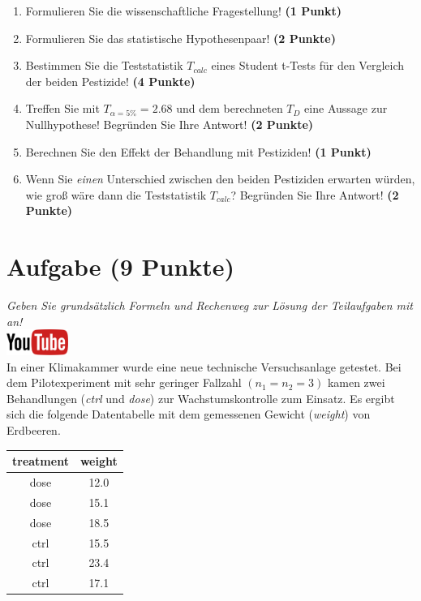 \documentclass[a4paper, 9pt]{scrartcl}\usepackage[]{graphicx}\usepackage[]{xcolor}
\begin{document}
\begin{enumerate}
  \item Formulieren Sie die wissenschaftliche Fragestellung! \textbf{(1 Punkt)}
  \item Formulieren Sie das statistische Hypothesenpaar! \textbf{(2
      Punkte)}
  \item Bestimmen Sie die Teststatistik $T_{calc}$ eines Student t-Tests f{\"u}r den
  Vergleich der beiden Pestizide! \textbf{(4 Punkte)}
\item Treffen Sie mit $T_{\alpha = 5\%} = 2.68$ und dem berechneten $T_{D}$ eine Aussage
  zur Nullhypothese! Begr{\"u}nden Sie Ihre Antwort! \textbf{(2 Punkte)}
\item Berechnen Sie den Effekt der Behandlung mit Pestiziden! \textbf{(1 Punkt)}
\item Wenn Sie \textit{einen} Unterschied zwischen den beiden
  Pestiziden erwarten w{\"u}rden, wie gro{\ss} w{\"a}re dann die Teststatistik
  $T_{calc}$? Begr{\"u}nden Sie Ihre Antwort! \textbf{(2 Punkte)}
\end{enumerate} 
\clearpage

\section{Aufgabe \hfill (9 Punkte)}

\textit{Geben Sie grunds{\"a}tzlich Formeln und Rechenweg zur L{\"o}sung der
  Teilaufgaben mit an!} \\[1Ex]

\hfill\href{https://youtu.be/eejS2uG4o-M}{\includegraphics[width =
  2cm]{img/youtube}}\\[1Ex]



In einer Klimakammer wurde eine neue technische Versuchsanlage getestet. Bei dem
Pilotexperiment mit sehr geringer Fallzahl $(n_1 = n_2 = 3)$ kamen zwei
Behandlungen (\textit{ctrl} und \textit{dose}) zur Wachstumskontrolle zum
Einsatz. Es ergibt sich die folgende Datentabelle mit dem gemessenen
Gewicht (\textit{weight}) von Erdbeeren.

\begin{table}[!h]
\centering
\begin{tabular}{cc}
\toprule
treatment & weight\\
\midrule
dose & 12.0\\
dose & 15.1\\
dose & 18.5\\
ctrl & 15.5\\
ctrl & 23.4\\
\addlinespace
ctrl & 17.1\\
\bottomrule
\end{tabular}
\end{table}
\end{document}
